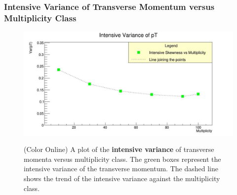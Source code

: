 \documentclass[letterpaper,aps,prc,superscriptaddress,nofootinbib,10pt,showpacs,floatfix]{revtex4-2}
\begin{document}
\subsubsection{Intensive Variance of Transverse Momentum versus Multiplicity Class}
\label{subsubsec:intvar}
\vspace{-5mm}
\begin{figure}[!htb]
\begin{minipage}{\textwidth}
   \label{Fig:7}
     \centering
     \renewcommand{\thefigure}{7}
     \includegraphics[width=\linewidth]{intvar}
     \begin{minipage}{0.8\textwidth}
     \caption{(Color Online) A plot of the \textbf{intensive variance} of transverse momenta versus multiplicity class. The green boxes represent the intensive variance of the transverse momentum. The dashed line shows the trend of the intensive variance against the multiplicity class.}
     \end{minipage}
\end{minipage}
\end{figure}

\FloatBarrier
\vspace{-3mm}
\end{document}
